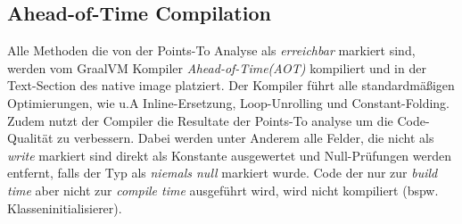 \subsection{Ahead-of-Time Compilation}
\label{subsec:aotc}

Alle Methoden die von der Points-To Analyse als \textit{erreichbar} markiert sind, werden vom GraalVM Kompiler \textit{Ahead-of-Time(AOT)}
kompiliert und in der Text-Section des native image platziert. Der Kompiler führt alle standardmäßigen Optimierungen, wie u.A Inline-Ersetzung, Loop-Unrolling und Constant-Folding.
Zudem nutzt der Compiler die Resultate der Points-To analyse um die Code-Qualität zu verbessern. Dabei werden unter Anderem alle Felder, die nicht als \textit{write} markiert sind direkt als Konstante ausgewertet und
Null-Prüfungen werden entfernt, falls der Typ als \textit{niemals null}  markiert wurde.
Code der nur zur \textit{build time} aber nicht zur \textit{compile time} ausgeführt wird, wird nicht kompiliert (bspw. Klasseninitialisierer).


